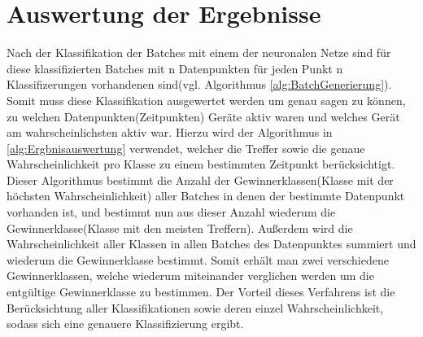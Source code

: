 \section{Auswertung der Ergebnisse}

    Nach der Klassifikation der Batches mit einem der neuronalen Netze sind für diese klassifizierten Batches mit n Datenpunkten für jeden Punkt n Klassifizerungen vorhandenen sind(vgl. Algorithmus \ref{alg:BatchGenerierung}).
    Somit muss diese Klassifikation ausgewertet werden um genau sagen zu können, zu welchen Datenpunkten(Zeitpunkten) Geräte aktiv waren und welches Gerät am wahrscheinlichsten aktiv war.
    Hierzu wird der Algorithmus in \ref{alg:Ergbnisauswertung} verwendet, welcher die Treffer sowie die genaue Wahrscheinlichkeit pro Klasse zu einem bestimmten Zeitpunkt berücksichtigt. 
    Dieser Algorithmus bestimmt die Anzahl der Gewinnerklassen(Klasse mit der höchsten Wahrscheinlichkeit) aller Batches in denen der bestimmte Datenpunkt vorhanden ist, und bestimmt nun aus dieser Anzahl wiederum die Gewinnerklasse(Klasse mit den meisten Treffern).
    Außerdem wird die Wahrscheinlichkeit aller Klassen in allen Batches des Datenpunktes summiert und wiederum die Gewinnerklasse bestimmt.
    Somit erhält man zwei verschiedene Gewinnerklassen, welche wiederum miteinander verglichen werden um die entgültige Gewinnerklasse zu bestimmen.
    \newline
    \noindent
    Der Vorteil dieses Verfahrens ist die Berücksichtung aller Klassifikationen sowie deren einzel Wahrscheinlichkeit, sodass sich eine genauere Klassifizierung ergibt.
